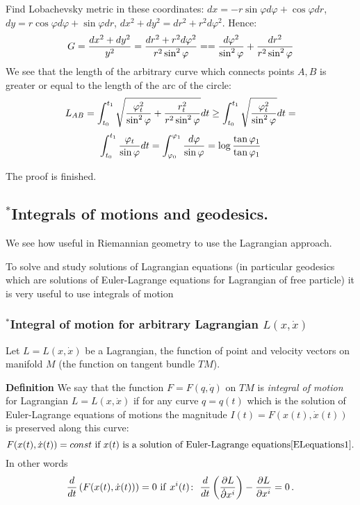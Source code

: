 \documentclass[12pt]{article}
\theoremstyle{theorem}
\numberwithin{equation}{section}
\begin{document}
{{Find Lobachevsky metric  in these coordinates:
 $dx=-r\sin\varphi d\varphi+\cos\varphi dr$, $dy=r\cos\varphi d\varphi+\sin\varphi dr$,
 $dx^2+dy^2=dr^2+r^2d\varphi^2$. Hence:
\begin{equation}\label{lob2}
  G={dx^2+dy^2\over y^2}={dr^2+r^2d\varphi^2\over r^2\sin^2\varphi}=
={d\varphi^2\over \sin^2\varphi}+{dr^2\over r^2\sin^2\varphi}
\end{equation}
We see
that the length of the arbitrary curve which connects points $A,B$
is greater or equal to the length of the arc of the circle:
\begin{equation}\label{lengthmin1}
 L_{AB}=
 \int_{t_0}^{t_1}\sqrt
 {{\varphi_t^2\over \sin^2 \varphi}+{r_t^2\over r^2\sin^2\varphi}}dt\geq
\int_{t_0}^{t_1}\sqrt
 {{\varphi_t^2\over \sin^2 \varphi}}dt=
 \end{equation}
 $$
\int_{t_0}^{t_1}
 {{\varphi_t\over \sin \varphi}}dt=
\int_{\varphi_0}^{\varphi_1}
 {{d\varphi\over \sin \varphi}}=
 \log {\tan \varphi_1\over \tan \varphi_1}
$$

The proof is finished.}



\subsection {$^*$Integrals of motions and geodesics.}

We see how useful in Riemannian geometry to use the Lagrangian approach.

To solve and study solutions of Lagrangian equations (in particular geodesics which are solutions of Euler-Lagrange
equations for Lagrangian of free particle) it is very useful to use {integrals of motion}

\subsubsection {$^*$Integral of motion for arbitrary Lagrangian $L(x,\dot x)$}
   Let $L=L(x,\dot x)$ be a Lagrangian, the function of point and velocity vectors on manifold $M$
   (the function on tangent bundle $TM$).

   {\bf Definition}  We say that the function $F=F(q,\dot q)$ on $TM$ is {\it integral of motion}
   for Lagrangian $L=L(x,\dot x)$ if for any curve $q=q(t)$ which is the solution of Euler-Lagrange equations of motions
     the magnitude  $I(t)=F(x(t), \dot x(t))$ is preserved along this curve:
               \begin{equation}\label{integralofmotion}
               F(x(t), \dot x(t))=const\,\,\hbox{if $x(t)$  is a solution of Euler-Lagrange equations\eqref{ELequations1}.}
                 \end{equation}
In other words
               \begin{equation}\label{integralofmotion2}
               {d\over dt}
               \left(F(x(t), \dot x(t))\right)=0\,\,{\rm if}\,\,
               x^i(t)\colon\,\,   {d\over dt}\left({\partial L\over \dot {\partial} x^i}\right)-{\partial L\over \partial x^i}=0\,.
                 \end{equation}

}
\end{document}
